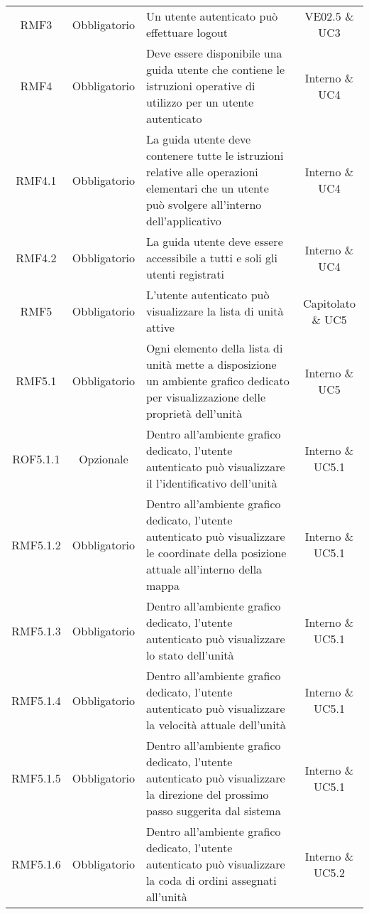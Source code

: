 \begin{longtable}[h!] { c c m{8cm} c}
		RMF3 & Obbligatorio & Un utente autenticato può effettuare logout & VE02.5 \& UC3 \\

		RMF4 & Obbligatorio & Deve essere disponibile una guida utente che contiene le istruzioni operative di utilizzo per un utente autenticato & Interno \& UC4 \\

		RMF4.1 & Obbligatorio & La guida utente deve contenere tutte le istruzioni relative alle operazioni elementari che un utente può svolgere all'interno dell'applicativo & Interno \& UC4 \\

		RMF4.2 & Obbligatorio & La guida utente deve essere accessibile a tutti e soli gli utenti registrati & Interno \& UC4 \\

		RMF5 & Obbligatorio & L'utente autenticato può visualizzare la lista di unità attive & Capitolato \& UC5 \\

		RMF5.1 & Obbligatorio & Ogni elemento della lista di unità mette a disposizione un ambiente grafico dedicato per visualizzazione delle proprietà dell'unità & Interno \& UC5 \\

		ROF5.1.1 & Opzionale & Dentro all'ambiente grafico dedicato, l'utente autenticato può visualizzare il l'identificativo dell'unità & Interno \& UC5.1 \\

		RMF5.1.2 & Obbligatorio & Dentro all'ambiente grafico dedicato, l'utente autenticato può visualizzare le coordinate della posizione attuale all'interno della mappa & Interno \& UC5.1 \\

		RMF5.1.3 & Obbligatorio &  Dentro all'ambiente grafico dedicato, l'utente autenticato può visualizzare lo stato dell'unità & Interno \& UC5.1 \\

		RMF5.1.4 & Obbligatorio &  Dentro all'ambiente grafico dedicato, l'utente autenticato può visualizzare la velocità attuale dell'unità & Interno \& UC5.1 \\

		RMF5.1.5 & Obbligatorio &  Dentro all'ambiente grafico dedicato, l'utente autenticato può visualizzare la direzione del prossimo passo suggerita dal sistema & Interno \& UC5.1 \\

		RMF5.1.6 & Obbligatorio &  Dentro all'ambiente grafico dedicato, l'utente autenticato può visualizzare la coda di ordini assegnati all'unità & Interno \& UC5.2 \\


\end{longtable}
